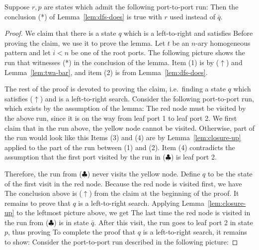 \begin{lemma}\label{lem:get-dfs}
Suppose $r,p$ are states which admit the following port-to-port run:
Then the conclusion (*) of Lemma~\ref{lem:dfs-does} is true with $r$ used instead of $\bar q$.
\end{lemma}
\begin{proof}
We claim that there  is a state $q$ which is a left-to-right \dfs and satisfies 
Before proving the claim, we use it to prove the lemma. Let  $t$ be an $n$-ary homogeneous pattern and let $i < n$ be one of the root ports. The following picture shows the run that witnesses (*) in the conclusion of the lemma. 
Item (1) is by ($\uparrow$) and Lemma~\ref{lem:twa-bar}, and item (2) is from Lemma~\ref{lem:dfs-does}. 

The rest of the proof is devoted to proving the claim, i.e.~finding a state $q$ which satisfies ($\uparrow$) and is a left-to-right search. Consider the following port-to-port  run, which exists by the assumption of the lemma:
The red node must be  visited by the above run, since it is on the way from leaf port 1 to leaf port 2. We first claim that in the run above, the yellow node cannot be visited. Otherwise, part of the run would look like this 
Items (3) and (4) are by Lemma~\ref{lem:closure-up} applied to the part of the run between (1) and (2). Item (4)  contradicts the assumption that the first port visited by the run in  ($\clubsuit$) is leaf port 2.   

Therefore, the run from ($\clubsuit$) never visits the yellow node. 
Define $q$ to be the state of the first visit in the red node. Because the red node is visited first, we have 
	The conclusion above is ($\uparrow$) from the claim at the beginning of the proof. It remains to prove that $q$ is a left-to-right search. 
	Applying Lemma~\ref{lem:closure-up} to the leftmost picture above, we get 
The last time the red node is visited in the run from ($\clubsuit$) is in state $\bar q$. After this visit, the run goes to leaf port 2 in state $p$, thus proving 
To complete the proof that $q$ is a left-to-right search, it remains to show: 
Consider the port-to-port run described in the following picture:


\end{proof}
